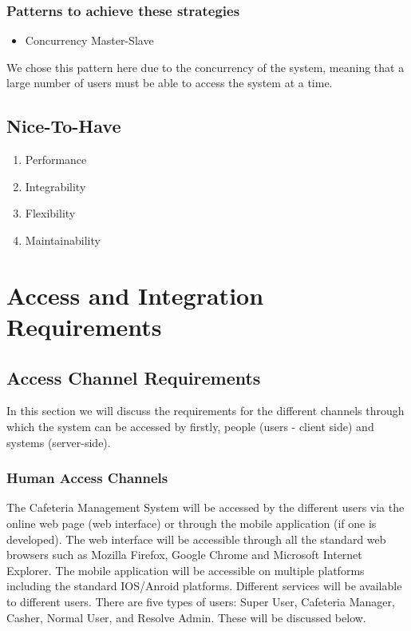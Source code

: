 \documentclass[a4paper,12pt]{article}
\begin{document}
\subsubsection{Patterns to achieve these strategies}
\begin{itemize}
\item Concurrency Master-Slave 
\end{itemize}
We chose this pattern here due to the concurrency of the system, meaning that a large number of users must be able to access the system at a time.


\subsection{Nice-To-Have}
	\begin{enumerate}
		\item Performance
		\item Integrability
		\item Flexibility
		\item Maintainability
\end{enumerate}

\section{Access and Integration Requirements}
\subsection{Access Channel Requirements}
In this section we will discuss the requirements for the different channels through which the system can be accessed by firstly, people (users - client side) and systems (server-side).


\subsubsection{Human Access Channels}
The Cafeteria Management System will be accessed by the different users via the online web page (web interface) or through the mobile application (if one is developed). The web interface will be accessible through all the standard web browsers such as Mozilla Firefox, Google Chrome and Microsoft Internet Explorer. The mobile application will be accessible on multiple platforms including the standard IOS/Anroid platforms. Different services will be available to different users. There are five types of users: Super User, Cafeteria Manager, Casher, Normal User, and Resolve Admin. These will be discussed below. \\
\end{document}
